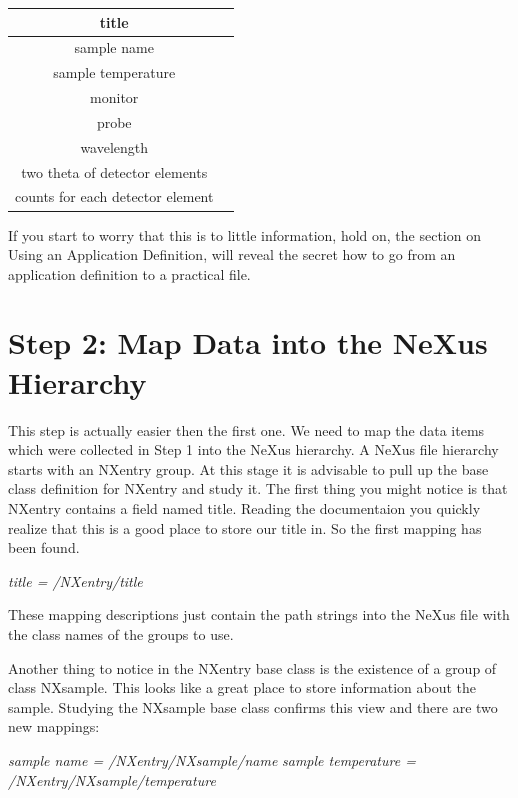 \documentclass[a4paper]{article}\usepackage[dvips]{graphicx}
\begin{document}
\begin{table}[!ht]
\begin{tabular}{|c|c|}
\hline
 title\\ \hline
sample name\\ \hline
sample temperature\\ \hline
monitor\\ \hline
probe\\ \hline
wavelength\\ \hline
two theta of detector elements\\ \hline
counts for each detector element\\ \hline
\end{tabular}
\end{table}
If you start to worry that this is to little information, hold on, the section on Using an Application Definition, will 
reveal the secret how to go from an application definition to a practical file.




\section{Step 2: Map Data into the NeXus Hierarchy }

This step is actually easier then the first one. We need to map the data items which were collected in Step 1 into the 
NeXus hierarchy. A NeXus file hierarchy starts with an NXentry group. At this stage it is advisable to pull up the base class 
definition for NXentry and study it. The first thing you might notice is that NXentry contains a field named title. Reading the 
documentaion you quickly realize that this is a good place to store our title in. So the first mapping has been found.


\begin{center}

 {\em  title = /NXentry/title}


\end{center}

These mapping descriptions just contain the path strings into the NeXus file with the class names of the groups to use.   


Another thing to notice in the NXentry base class is the existence of a group of class NXsample. This looks like a great 
place to store information about the sample. Studying the NXsample base class confirms this view and there are two new mappings:


\begin{center}

 {\em  sample name  =  /NXentry/NXsample/name} \linebreak
 {\em  sample temperature  = /NXentry/NXsample/temperature}


\end{center}
\end{document}
